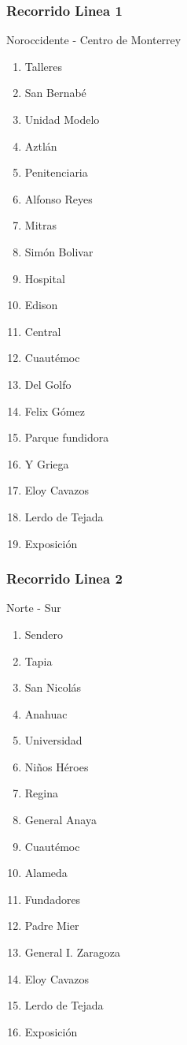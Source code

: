 \documentclass[a4paper]{article}
\begin{document}
\subsubsection{Recorrido Linea 1}
 Noroccidente  - Centro de Monterrey
\begin{enumerate}
\item Talleres
\item San Bernabé
\item Unidad Modelo
\item Aztlán
\item Penitenciaria
\item Alfonso Reyes
\item Mitras
\item Simón Bolivar
\item Hospital
\item Edison
\item Central
\item Cuautémoc
\item Del Golfo
\item Felix Gómez
\item Parque fundidora
\item Y Griega
\item Eloy Cavazos
\item Lerdo de Tejada
\item Exposición
\end{enumerate}

\autocite{LineasMetro}

\subsubsection{Recorrido Linea 2}
Norte - Sur
\begin{enumerate}
\item Sendero
\item Tapia
\item San Nicolás
\item Anahuac
\item Universidad
\item Niños Héroes
\item Regina
\item General Anaya
\item Cuautémoc
\item Alameda
\item Fundadores
\item Padre Mier
\item General I. Zaragoza
\item Eloy Cavazos
\item Lerdo de Tejada
\item Exposición
\end{enumerate}
\end{document}
